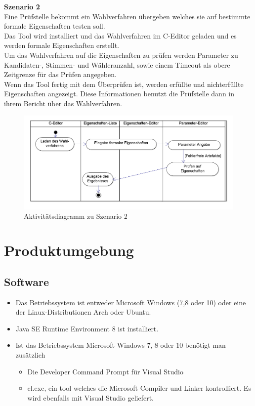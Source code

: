 \documentclass[a4paper]{scrreprt}
\begin{document}
\textbf{Szenario 2}\\
Eine Prüfstelle bekommt ein Wahlverfahren übergeben welches sie auf bestimmte formale Eigenschaften testen soll.\\
Das Tool wird installiert und das Wahlverfahren im C-Editor geladen und es werden formale Eigenschaften erstellt.\\
Um das Wahlverfahren auf die Eigenschaften zu prüfen werden Parameter zu \\Kandidaten-, Stimmen- und Wähleranzahl, sowie einem Timeout als obere Zeitgrenze für das Prüfen angegeben.\\
Wenn das Tool fertig mit dem Überprüfen ist, werden erfüllte und nichterfüllte Eigenschaften angezeigt. Diese Informationen benutzt die Prüfstelle dann in ihrem Bericht über das Wahlverfahren.\\

\begin{figure}[H]
\hspace{-1cm}
\includegraphics[scale=0.12]{ActivityDiagramScenario2.png}
\caption{Aktivitätsdiagramm zu Szenario 2}
\label{Packet-scetch}
\end{figure}

\chapter{Produktumgebung}

\section{Software}
\begin{itemize}
\item Das Betriebssystem ist entweder Microsoft Windows (7,8 oder 10) oder eine der Linux-Distributionen Arch oder Ubuntu.
\item Java SE Runtime Environment 8 ist installiert.
\item Ist das Betriebssystem Microsoft Windows 7, 8 oder 10 benötigt man zusätzlich
\begin{itemize}
\item Die Developer Command Prompt für Visual Studio
\item cl.exe, ein tool welches die Microsoft Compiler und Linker kontrolliert. Es wird ebenfalls mit Visual Studio geliefert.
\end{itemize}
\end{itemize}
\end{document}
